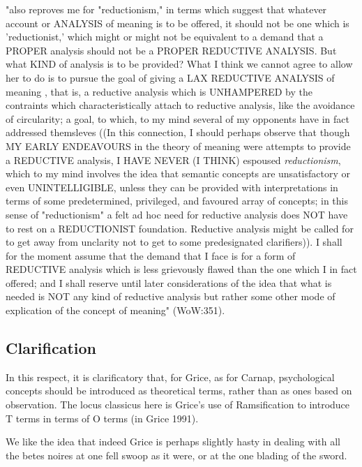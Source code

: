 \documentclass[10pt,titlepage]{book}
\begin{document}
"also reproves me for "reductionism," in terms which suggest that  whatever 
account or ANALYSIS of meaning is to be offered, it should not be one  
which is 'reductionist,' which might or might not be equivalent to a demand that 
 a PROPER analysis should not be a PROPER REDUCTIVE ANALYSIS. But what KIND 
of  analysis is to be provided? What I think we cannot agree to allow her 
to do is  to pursue the goal of giving a LAX REDUCTIVE ANALYSIS of meaning , 
that is, a  reductive analysis which is UNHAMPERED by the contraints which  
characteristically attach to reductive analysis, like the avoidance of  
circularity; a goal, to which, to my mind several of my opponents have in fact  
addressed themsleves ((In this connection, I should perhaps observe that 
though  MY EARLY ENDEAVOURS in the theory of meaning were attempts to provide a 
 REDUCTIVE analysis, I HAVE NEVER (I THINK) espoused {\it reductionism}, which 
to my  mind involves the idea that semantic concepts are unsatisfactory or 
even  UNINTELLIGIBLE, unless they can be provided with interpretations in 
terms of  some predetermined, privileged, and favoured array of concepts; in 
this sense of  "reductionism" a felt ad hoc need for reductive analysis does 
NOT have to rest  on a REDUCTIONIST foundation. Reductive analysis might be 
called for to get away  from unclarity not to get to some predesignated 
clarifiers)). I shall for the  moment assume that the demand that I face is for a 
form of REDUCTIVE analysis  which is less grievously flawed than the one 
which I in fact offered; and I  shall reserve until later considerations of 
the idea that what is needed is NOT  any kind of reductive analysis but rather 
some other mode of explication of the  concept of meaning" (WoW:351).

\subsection{Clarification}
 
In this respect, it is clarificatory that, for Grice, as for Carnap,  
psychological concepts should be introduced as theoretical terms, rather than  
as ones based on observation. The locus classicus here is Grice's use of  
Ramsification to introduce T terms in terms of O terms (in Grice 1991). 

We like the idea  that indeed Grice is perhaps slightly hasty in dealing 
with all the betes noires  at one fell swoop as it were, or at the one blading 
of the sword. 
 
\end{document}
